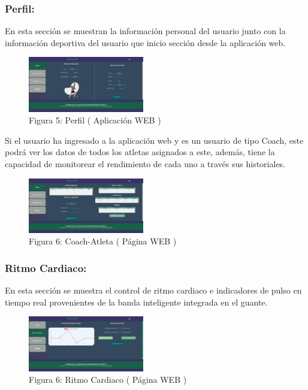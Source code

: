 \documentclass[osajnl,twocolumn,showpacs,superscriptaddress,10pt]{revtex4-1}
\begin{document}
\subsubsection{Perfil:}
    En esta sección se muestran la información personal del usuario junto con la información deportiva del usuario que inicio sección desde la aplicación web.
    
\begin{figure} [H] \centering 
\caption{Figura 5: Perfil ( Aplicación WEB )}
\includegraphics[width=0.45\textwidth]{Perfil.PNG}
\end{figure}

    Si el usuario ha ingresado a la aplicación web y es un usuario de tipo Coach, este podrá ver los datos de todos los atletas asignados a este, además, tiene la capacidad de monitorear el rendimiento de cada uno a través sus historiales.
    
\begin{figure} [H] \centering 
\caption{Figura 6: Coach-Atleta ( Página WEB )}
\includegraphics[width=0.45\textwidth]{CoachAtleta.PNG}
\end{figure}

\subsubsection{Ritmo Cardiaco:}
    En esta sección se muestra el control de ritmo cardiaco e indicadores de pulso en tiempo real provenientes de la banda inteligente integrada en el guante.
    
\begin{figure} [H] \centering 
\caption{Figura 6: Ritmo Cardiaco ( Página WEB )}
\includegraphics[width=0.45\textwidth]{RitmoC.PNG}
\end{figure}
\end{document}
